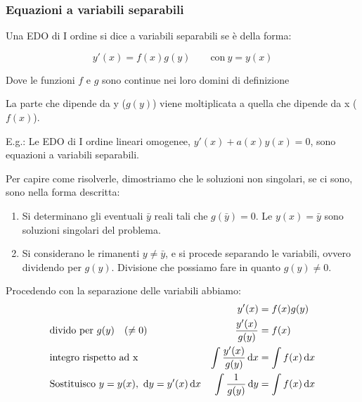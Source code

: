 \pagebreak
\subsubsection{Equazioni a variabili separabili}

Una EDO di I ordine si dice a variabili separabili se è della forma:

\[
    y'(x) = f(x) g(y) \qquad \text{con}\ y=y(x)
\]

Dove le funzioni \(f\) e \(g\) sono continue nei loro domini di definizione

La parte che dipende da y (\(g(y)\)) viene moltiplicata a quella che dipende da x (\(f(x)\)).

E.g.: Le EDO di I ordine lineari omogenee, \(y'(x)+a(x)y(x)=0\), sono equazioni a variabili separabili.



Per capire come risolverle, dimostriamo che le soluzioni non singolari, se ci sono, sono nella forma descritta:

\begin{enumerate}
    \item Si determinano gli eventuali \(\bar y\) reali tali che \(g(\bar y) = 0\). Le \(y(x) = \bar y\) sono soluzioni singolari del problema.

    \item Si considerano le rimanenti \(y \neq \bar y\), e si procede separando le variabili, ovvero dividendo per \(g(y)\). Divisione che possiamo fare in quanto \(g(y) \ne 0\).
\end{enumerate}

\filbreak{}

Procedendo con la separazione delle variabili abbiamo:
\begin{align*}
     &                                                        & y'(x)                           & = f(x)g(y)          \\
     & \text{divido per}\ g(y) \quad (\ne 0)                  & \frac{y'(x)}{g(y)}              & = f(x)              \\
     & \text{integro rispetto ad x}                           & \int \frac{y'(x)}{g(y)} \mathop{}\!\mathrm{d} x & = \int f(x) \mathop{}\!\mathrm{d} x \\
     & \text{Sostituisco}\ y = y(x),\ \mathop{}\!\mathrm{d} y = y'(x) \mathop{}\!\mathrm{d} x & \int \frac{1}{g(y)} \mathop{}\!\mathrm{d} y     & = \int f(x) \mathop{}\!\mathrm{d} x \\
\end{align*}

